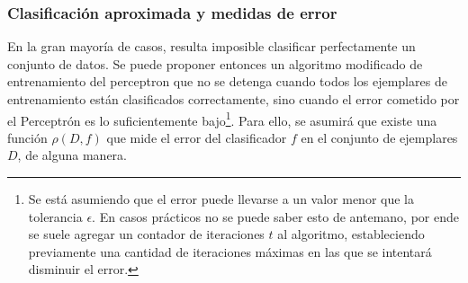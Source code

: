 %
%
%
%

\subsubsection{Clasificación aproximada y medidas de error}

En la gran mayoría de casos, resulta imposible clasificar perfectamente un conjunto de datos. Se puede proponer entonces un algoritmo modificado de entrenamiento del perceptron que no se detenga cuando todos los ejemplares de entrenamiento están clasificados correctamente, sino cuando el error cometido por el Perceptrón es lo suficientemente bajo\footnote{Se está asumiendo que el error puede llevarse a un valor menor que la tolerancia $\epsilon$. En casos prácticos no se puede saber esto de antemano, por ende se suele agregar un contador de iteraciones $t$ al algoritmo, estableciendo previamente una cantidad de iteraciones máximas en las que se intentará disminuir el error.}. Para ello, se asumirá que existe una función $\rho(D,f)$ que mide el error del clasificador $f$ en el conjunto de ejemplares $D$, de alguna manera.

